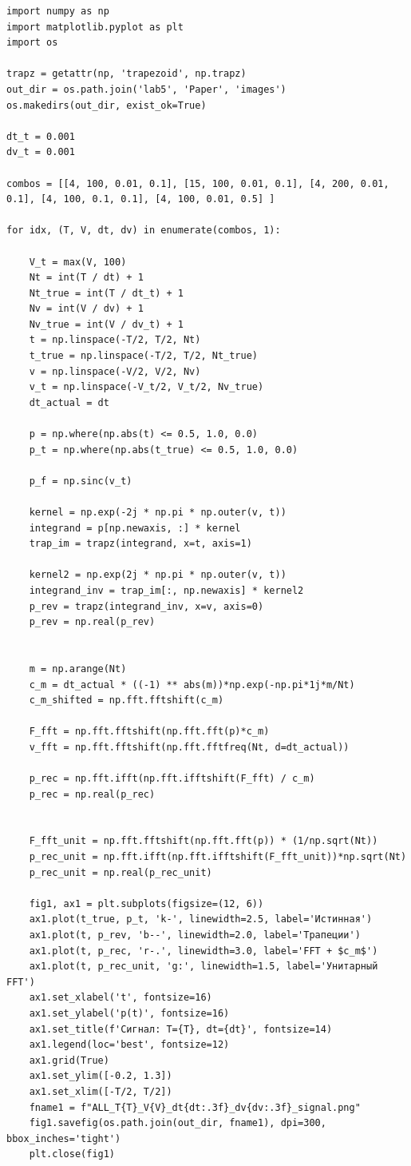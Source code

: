 \documentclass[a4paper, 12pt]{article}
\begin{document}
\begin{lstlisting}[caption={Код для построения сравнения методов}]
    import numpy as np
import matplotlib.pyplot as plt
import os

trapz = getattr(np, 'trapezoid', np.trapz)
out_dir = os.path.join('lab5', 'Paper', 'images')
os.makedirs(out_dir, exist_ok=True)

dt_t = 0.001
dv_t = 0.001

combos = [[4, 100, 0.01, 0.1], [15, 100, 0.01, 0.1], [4, 200, 0.01, 0.1], [4, 100, 0.1, 0.1], [4, 100, 0.01, 0.5] ]

for idx, (T, V, dt, dv) in enumerate(combos, 1):

    V_t = max(V, 100)
    Nt = int(T / dt) + 1
    Nt_true = int(T / dt_t) + 1
    Nv = int(V / dv) + 1
    Nv_true = int(V / dv_t) + 1
    t = np.linspace(-T/2, T/2, Nt)
    t_true = np.linspace(-T/2, T/2, Nt_true)
    v = np.linspace(-V/2, V/2, Nv)
    v_t = np.linspace(-V_t/2, V_t/2, Nv_true)
    dt_actual = dt

    p = np.where(np.abs(t) <= 0.5, 1.0, 0.0)
    p_t = np.where(np.abs(t_true) <= 0.5, 1.0, 0.0)

    p_f = np.sinc(v_t)

    kernel = np.exp(-2j * np.pi * np.outer(v, t))
    integrand = p[np.newaxis, :] * kernel
    trap_im = trapz(integrand, x=t, axis=1)

    kernel2 = np.exp(2j * np.pi * np.outer(v, t))
    integrand_inv = trap_im[:, np.newaxis] * kernel2
    p_rev = trapz(integrand_inv, x=v, axis=0)
    p_rev = np.real(p_rev)

  
    m = np.arange(Nt)
    c_m = dt_actual * ((-1) ** abs(m))*np.exp(-np.pi*1j*m/Nt)
    c_m_shifted = np.fft.fftshift(c_m)

    F_fft = np.fft.fftshift(np.fft.fft(p)*c_m)
    v_fft = np.fft.fftshift(np.fft.fftfreq(Nt, d=dt_actual))

    p_rec = np.fft.ifft(np.fft.ifftshift(F_fft) / c_m)
    p_rec = np.real(p_rec)

    
    F_fft_unit = np.fft.fftshift(np.fft.fft(p)) * (1/np.sqrt(Nt))
    p_rec_unit = np.fft.ifft(np.fft.ifftshift(F_fft_unit))*np.sqrt(Nt)
    p_rec_unit = np.real(p_rec_unit)

    fig1, ax1 = plt.subplots(figsize=(12, 6))
    ax1.plot(t_true, p_t, 'k-', linewidth=2.5, label='Истинная')
    ax1.plot(t, p_rev, 'b--', linewidth=2.0, label='Трапеции')
    ax1.plot(t, p_rec, 'r-.', linewidth=3.0, label='FFT + $c_m$')
    ax1.plot(t, p_rec_unit, 'g:', linewidth=1.5, label='Унитарный FFT')
    ax1.set_xlabel('t', fontsize=16)
    ax1.set_ylabel('p(t)', fontsize=16)
    ax1.set_title(f'Сигнал: T={T}, dt={dt}', fontsize=14)
    ax1.legend(loc='best', fontsize=12)
    ax1.grid(True)
    ax1.set_ylim([-0.2, 1.3])
    ax1.set_xlim([-T/2, T/2])
    fname1 = f"ALL_T{T}_V{V}_dt{dt:.3f}_dv{dv:.3f}_signal.png"
    fig1.savefig(os.path.join(out_dir, fname1), dpi=300, bbox_inches='tight')
    plt.close(fig1)


\end{lstlisting}
\end{document}

